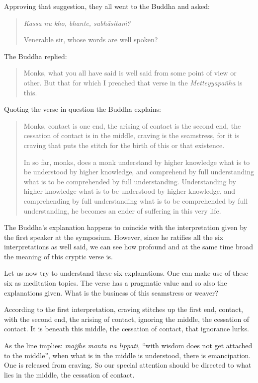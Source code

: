 Approving that suggestion, they all went to the Buddha and asked:

\begin{quote}
\emph{Kassa nu kho, bhante, subhāsitaṁ?}

Venerable sir, whose words are well spoken?
\end{quote}

The Buddha replied:

\begin{quote}
Monks, what you all have said is well said from some point of view or other. But that for which I preached that verse in the \emph{Metteyyapañha} is this.
\end{quote}

Quoting the verse in question the Buddha explains:

\begin{quote}
Monks, contact is one end, the arising of contact is the second end, the cessation of contact is in the middle, craving is the seamstress, for it is craving that puts the stitch for the birth of this or that existence.

In so far, monks, does a monk understand by higher knowledge what is to be understood by higher knowledge, and comprehend by full understanding what is to be comprehended by full understanding. Understanding by higher knowledge what is to be understood by higher knowledge, and comprehending by full understanding what is to be comprehended by full understanding, he becomes an ender of suffering in this very life.
\end{quote}

The Buddha's explanation happens to coincide with the interpretation given by the first speaker at the symposium. However, since he ratifies all the six interpretations as well said, we can see how profound and at the same time broad the meaning of this cryptic verse is.

Let us now try to understand these six explanations. One can make use of these six as meditation topics. The verse has a pragmatic value and so also the explanations given. What is the business of this seamstress or weaver?

According to the first interpretation, craving stitches up the first end, contact, with the second end, the arising of contact, ignoring the middle, the cessation of contact. It is beneath this middle, the cessation of contact, that ignorance lurks.

As the line implies: \emph{majjhe mantā na lippati}, ``with wisdom does not get attached to the middle'', when what is in the middle is understood, there is emancipation. One is released from craving. So our special attention should be directed to what lies in the middle, the cessation of contact.

